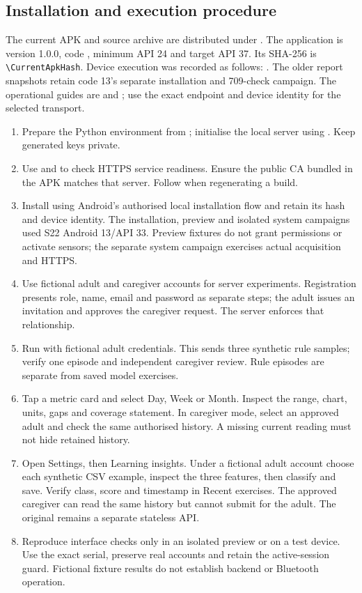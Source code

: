\subsection{Installation and execution procedure}
The current APK and source archive are distributed under . The application is version 1.0.0, code \CurrentVersionCode{}, minimum API 24 and target API 37. Its SHA-256 is \expandafter\nolinkurl\expandafter{\CurrentApkHash}. Device execution was recorded as follows: \CurrentAndroidResult. The older report snapshots retain code 13's separate installation and 709-check campaign. The operational guides are  and ; use the exact endpoint and device identity for the selected transport.
\begin{enumerate}
\item Prepare the Python environment from ; initialise the local server using . Keep generated keys private.
\item Use  and  to check HTTPS service readiness. Ensure the public CA bundled in the APK matches that server. Follow  when regenerating a build.
\item Install  using Android's authorised local installation flow and retain its hash and device identity. The installation, preview and isolated system campaigns used S22 Android 13/API 33. Preview fixtures do not grant permissions or activate sensors; the separate system campaign exercises actual acquisition and HTTPS.
\item Use fictional adult and caregiver accounts for server experiments. Registration presents role, name, email and password as separate steps; the adult issues an invitation and approves the caregiver request. The server enforces that relationship.
\item Run  with fictional adult credentials. This sends three synthetic rule samples; verify one episode and independent caregiver review. Rule episodes are separate from saved model exercises.
\item Tap a metric card and select Day, Week or Month. Inspect the range, chart, units, gaps and coverage statement. In caregiver mode, select an approved adult and check the same authorised history. A missing current reading must not hide retained history.
\item Open Settings, then Learning insights. Under a fictional adult account choose each synthetic CSV example, inspect the three features, then classify and save. Verify class, score and timestamp in Recent exercises. The approved caregiver can read the same history but cannot submit for the adult. The original  remains a separate stateless API.
\item Reproduce interface checks only in an isolated preview or on a test device. Use the exact serial, preserve real accounts and retain the active-session guard. Fictional fixture results do not establish backend or Bluetooth operation.
\end{enumerate}

